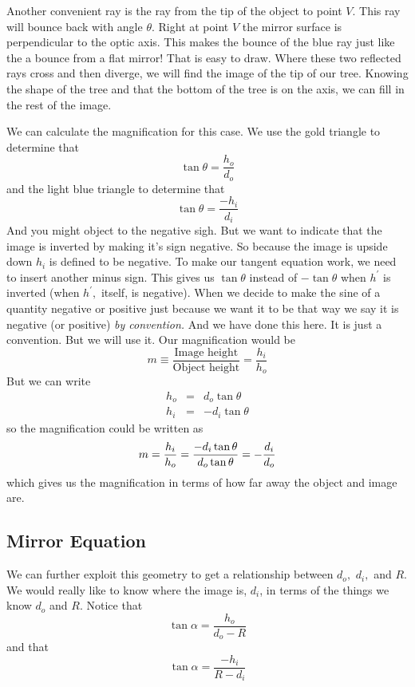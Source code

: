 \documentclass{article}
\begin{document}
Another convenient ray is the ray from the tip of the object to point $V.$
This ray will bounce back with angle $\theta $. Right at point $V$ the
mirror surface is perpendicular to the optic axis. This makes the bounce of
the blue ray just like the a bounce from a flat mirror! That is easy to
draw. Where these two reflected rays cross and then diverge, we will find
the image of the tip of our tree. Knowing the shape of the tree and that the
bottom of the tree is on the axis, we can fill in the rest of the image.

We can calculate the magnification for this case. We use the gold triangle
to determine that 
\[
\tan \theta =\frac{h_{o}}{d_{o}}
\]%
and the light blue triangle to determine that 
\[
\tan \theta =\frac{-h_{i}}{d_{i}}
\]%
And you might object to the negative sigh. But we want to indicate that the
image is inverted by making it's sign negative. So because the image is
upside down $h_{i}$ is defined to be negative. To make our tangent equation
work, we need to insert another minus sign. This gives us $\tan \theta $
instead of $-\tan \theta $ when $h^{\prime }$ is inverted (when $h^{\prime
}, $ itself, is negative). When we decide to make the sine of a quantity
negative or positive just because we want it to be that way we say it is
negative (or positive) \emph{by convention.} And we have done this here. It
is just a convention. But we will use it. Our magnification would be%
\[
m\equiv \frac{\text{Image height}}{\text{Object height}}=\frac{h_{i}}{h_{o}}
\]%
But we can write 
\begin{eqnarray*}
h_{o} &=&d_{o}\tan \theta \\
h_{i} &=&-d_{i}\tan \theta
\end{eqnarray*}%
so the magnification could be written as 
\[
m=\frac{h_{i}}{h_{o}}=\frac{-d_{i}\tan \theta }{d_{o}\tan \theta }=-\frac{%
d_{i}}{d_{o}}
\]%
which gives us the magnification in terms of how far away the object and
image are.

\subsection{Mirror Equation}

We can further exploit this geometry to get a relationship between $d_{o},$ $%
d_{i},$ and $R.$ We would really like to know where the image is, $d_{i}$,
in terms of the things we know $d_{o}$ and $R.$ Notice that 
\[
\tan \alpha =\frac{h_{o}}{d_{o}-R}
\]%
and that 
\[
\tan \alpha =\frac{-h_{i}}{R-d_{i}}
\]
\end{document}
